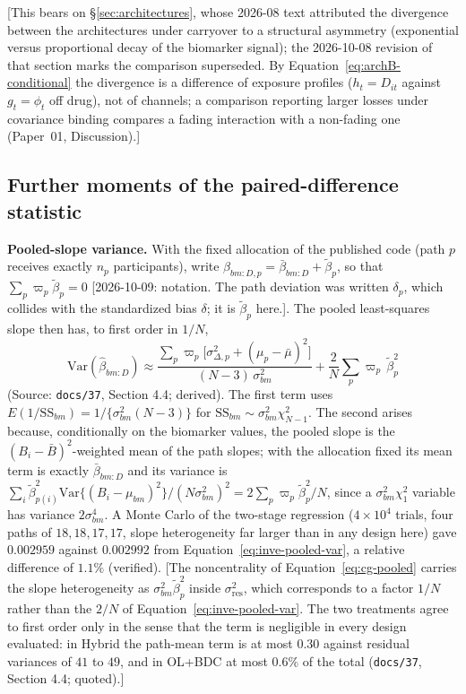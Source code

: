 \documentclass[11pt]{article}
\newcommand{\note}[1]{\textcolor{blue!60!black}{\small [#1]}}
\newcommand{\code}[1]{\texttt{#1}}
\begin{document}
\note{This bears on \S\ref{sec:architectures}, whose 2026-08 text
attributed the divergence between the architectures under carryover to
a structural asymmetry (exponential versus proportional decay of the
biomarker signal); the 2026-10-08 revision of that section marks the
comparison superseded. By Equation~\eqref{eq:archB-conditional} the divergence is a difference
of exposure profiles ($h_t = D_{it}$ against $g_t = \phi_t$ off drug),
not of channels; a comparison reporting larger losses under covariance
binding compares a fading interaction with a non-fading one (Paper~01,
Discussion).}

\subsection{Further moments of the paired-difference statistic}
\label{sec:inve-cg-moments}

\textbf{Pooled-slope variance.} With the fixed allocation of the
published code (path $p$ receives exactly $n_p$ participants), write
$\beta_{bm:D,p} = \bar\beta_{bm:D} + \tilde\beta_p$, so that
$\sum_p \varpi_p\tilde\beta_p = 0$ \note{2026-10-09: notation. The path
deviation was written $\delta_p$, which collides with the standardized
bias $\delta$; it is $\tilde\beta_p$ here.}. The pooled least-squares slope then has, to
first order in $1/N$,
\begin{equation}
\mathrm{Var}(\hat\beta_{bm:D}) \approx
\frac{\sum_p \varpi_p\big[\sigma_{\Delta,p}^2 + (\mu_p - \bar\mu)^2\big]}
     {(N - 3)\,\sigma_{bm}^2}
+ \frac{2}{N}\sum_p \varpi_p\,\tilde\beta_p^2
\label{eq:inve-pooled-var}
\end{equation}
(Source: \code{docs/37}, Section 4.4; derived). The first term uses
$E(1/\mathrm{SS}_{bm}) = 1/\{\sigma_{bm}^2(N-3)\}$ for
$\mathrm{SS}_{bm} \sim \sigma_{bm}^2\chi^2_{N-1}$. The second arises
because, conditionally on the biomarker values, the pooled slope is the
$(B_i - \bar B)^2$-weighted mean of the path slopes; with the allocation
fixed its mean term is exactly $\bar\beta_{bm:D}$ and its variance is
$\sum_i \tilde\beta_{p(i)}^2 \mathrm{Var}\{(B_i-\mu_{bm})^2\}/(N\sigma_{bm}^2)^2
= 2\sum_p \varpi_p\tilde\beta_p^2/N$, since a $\sigma_{bm}^2\chi^2_1$ variable has
variance $2\sigma_{bm}^4$. A Monte Carlo of the two-stage regression
($4\times10^4$ trials, four paths of $18, 18, 17, 17$, slope
heterogeneity far larger than in any design here) gave $0.002959$
against $0.002992$ from Equation~\eqref{eq:inve-pooled-var}, a relative
difference of $1.1\%$ (verified). \note{The noncentrality of
Equation~\eqref{eq:cg-pooled} carries the slope heterogeneity as
$\sigma_{bm}^2\tilde\beta_p^2$ inside $\sigma^2_{\mathrm{res}}$, which
corresponds to a factor $1/N$ rather than the $2/N$ of
Equation~\eqref{eq:inve-pooled-var}. The two treatments agree to first
order only in the sense that the term is negligible in every design
evaluated: in Hybrid the path-mean term is at most $0.30$ against
residual variances of $41$ to $49$, and in OL+BDC at most $0.6\%$ of the
total (\code{docs/37}, Section 4.4; quoted).}
\end{document}
